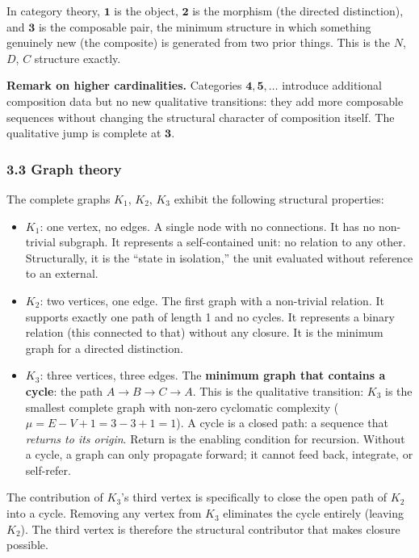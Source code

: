 \documentclass[
  11pt,
  letterpaper,
]{article}
\begin{document}
In category theory, \(\mathbf{1}\) is the object, \(\mathbf{2}\) is the
morphism (the directed distinction), and \(\mathbf{3}\) is the
composable pair, the minimum structure in which something genuinely new
(the composite) is generated from two prior things. This is the \(N\),
\(D\), \(C\) structure exactly.

\textbf{Remark on higher cardinalities.} Categories
\(\mathbf{4}, \mathbf{5}, \ldots\) introduce additional composition data
but no new qualitative transitions: they add more composable sequences
without changing the structural character of composition itself. The
qualitative jump is complete at \(\mathbf{3}\).

\subsubsection{3.3 Graph theory}\label{graph-theory}

The complete graphs \(K_1\), \(K_2\), \(K_3\) exhibit the following
structural properties:

\begin{itemize}
\item
  \(K_1\): one vertex, no edges. A single node with no connections. It
  has no non-trivial subgraph. It represents a self-contained unit: no
  relation to any other. Structurally, it is the ``state in isolation,''
  the unit evaluated without reference to an external.
\item
  \(K_2\): two vertices, one edge. The first graph with a non-trivial
  relation. It supports exactly one path of length 1 and no cycles. It
  represents a binary relation (this connected to that) without any
  closure. It is the minimum graph for a directed distinction.
\item
  \(K_3\): three vertices, three edges. The \textbf{minimum graph that
  contains a cycle}: the path \(A \to B \to C \to A\). This is the
  qualitative transition: \(K_3\) is the smallest complete graph with
  non-zero cyclomatic complexity (\(\mu = E - V + 1 = 3 - 3 + 1 = 1\)).
  A cycle is a closed path: a sequence that \emph{returns to its
  origin}. Return is the enabling condition for recursion. Without a
  cycle, a graph can only propagate forward; it cannot feed back,
  integrate, or self-refer.
\end{itemize}

The contribution of \(K_3\)'s third vertex is specifically to close the
open path of \(K_2\) into a cycle. Removing any vertex from \(K_3\)
eliminates the cycle entirely (leaving \(K_2\)). The third vertex is
therefore the structural contributor that makes closure possible.
\end{document}
